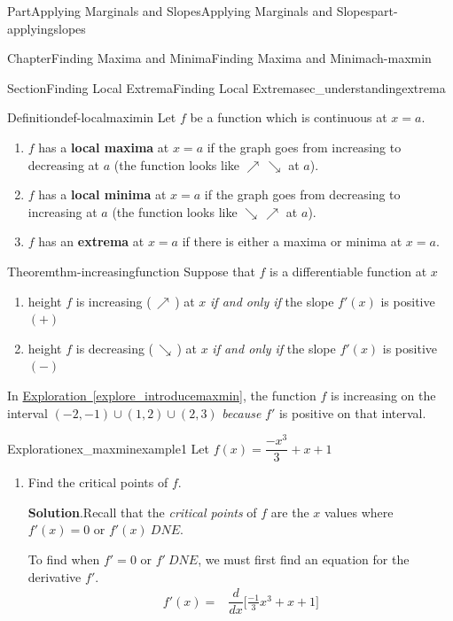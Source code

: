 \documentclass{tufte-book}
\newcommand{\blocktitlefont}{\relax}
\newcommand{\xreffont}{\relax}
\newcommand{\terminology}[1]{\textbf{#1}}
\numberwithin{equation}{chapter}
\newcommand{\ddx}[1]{ \dfrac{d}{dx} \Big[ #1 \Big]  }
\newcommand{\amp}{&}
\begin{document}
\begin{partptx}{Part}{Applying Marginals and Slopes}{}{Applying Marginals and Slopes}{}{}{part-applyingslopes}
\begin{chapterptx}{Chapter}{Finding Maxima and Minima}{}{Finding Maxima and Minima}{}{}{ch-maxmin}
\begin{sectionptx}{Section}{Finding Local Extrema}{}{Finding Local Extrema}{}{}{sec_understandingextrema}
\begin{definition}{Definition}{}{def-localmaximin}%
Let \(f\) be a function which is continuous at \(x=a\).%
%
\begin{enumerate}
\item{}\(f\) has a \terminology{local maxima} at \(x=a\) if the graph goes from increasing to decreasing at \(a\) (the function looks like \(\nearrow\,\searrow\) at \(a\)).%
\item{}\(f\) has a \terminology{local minima} at \(x=a\) if the graph goes from decreasing to increasing at \(a\) (the function looks like \(\searrow\,\nearrow\) at \(a\)).%
\item{}\(f\) has an \terminology{extrema} at \(x=a\) if there is either a maxima or minima at \(x=a\).%
\end{enumerate}
\end{definition}
\begin{theorem}{Theorem}{}{}{thm-increasingfunction}%
Suppose that \(f\) is a differentiable function at \(x\)%
%
\begin{enumerate}
\item{}height \(f\) is increasing (\(\,\nearrow\,\)) at \(x\) \emph{if and only if} the slope \(f'(x)\) is positive \((+)\)%
\item{}height \(f\) is decreasing (\(\,\searrow\,\)) at \(x\) \emph{if and only if} the slope \(f'(x)\) is positive \((-)\)%
\end{enumerate}
\end{theorem}
In \hyperref[explore_introducemaxmin]{Exploration~{\xreffont\ref{explore_introducemaxmin}}}, the function \(f\) is increasing  on the interval \((-2,-1) \cup (1,2)\cup (2,3)\) \emph{because} \(f'\) is positive on that interval.%
\begin{exploration}{Exploration}{}{ex_maxminexample1}%
Let \(f(x) = \dfrac{-x^3}{3} + x + 1\)%
\begin{enumerate}[font=\bfseries,label=(\alph*),ref=\alph*]%
\item{}Find the critical points of \(f\).%
\par\smallskip%
\noindent\textbf{\blocktitlefont Solution}.\hypertarget{ex_maxminexample1-2-2}{}\quad{}Recall that the \emph{critical points} of \(f\) are the \(x\) values where  \(f'(x) =0\) or \(f'(x) \ DNE\).%
\par
To find when \(f'=0\) or \(f'\ DNE\), we must first find an equation for the derivative \(f'\).%
\begin{align*}
f'(x) = \amp \ddx{ \frac{-1}{3} x^3 + x + 1  } \\

\end{align*}
\end{enumerate}
\end{exploration}
\end{sectionptx}
\end{chapterptx}
\end{partptx}
\end{document}
